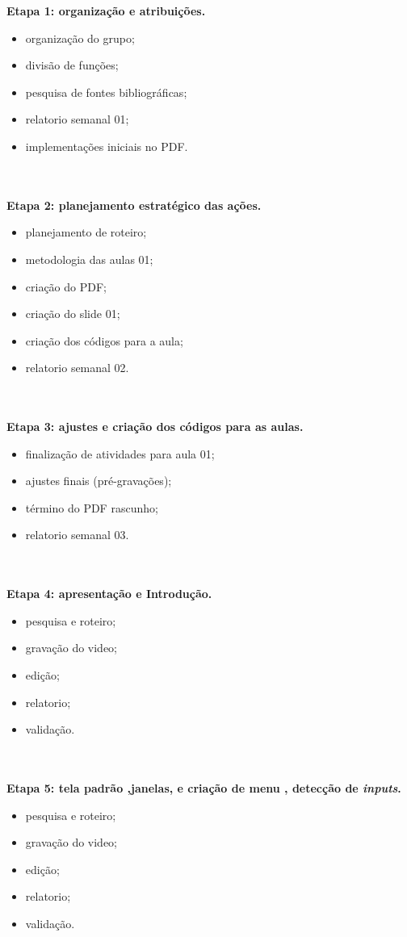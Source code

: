 \documentclass[a4paper,10pt]{article} %
\begin{document}
\textbf{Etapa 1: organização e atribuições.}
\begin{itemize}
  \item organização do grupo;
  \item divisão de funções;
  \item pesquisa de fontes bibliográficas;
  \item relatorio semanal 01;
  \item implementações iniciais no PDF.
\end{itemize}
\\
\\
\textbf{Etapa 2: planejamento estratégico das ações.}
\begin{itemize}
  \item planejamento de roteiro;
  \item metodologia das aulas 01;
  \item criação do PDF;
  \item criação do slide 01;
  \item criação dos códigos para a aula;
  \item relatorio semanal 02.
\end{itemize}
\\
\\
\textbf{Etapa 3: ajustes e criação dos códigos para as aulas.}
\begin{itemize}
  \item finalização de atividades para aula 01;
  \item ajustes finais (pré-gravações);
  \item término do PDF rascunho;
  \item relatorio semanal 03.
\end{itemize}
\\
\\
\textbf{Etapa 4: apresentação e Introdução.}
 \begin{itemize}
  \item pesquisa e roteiro;
  \item gravação do video;
  \item  edição;
  \item relatorio;
  \item  validação.
\end{itemize}
\\
\\
\textbf{Etapa 5: tela padrão ,janelas, e criação de menu , detecção de \textit{inputs}.}
 \begin{itemize}
  \item pesquisa e roteiro;
  \item gravação do video;
  \item  edição;
  \item relatorio;
  \item  validação.
\end{itemize}
\end{document}

